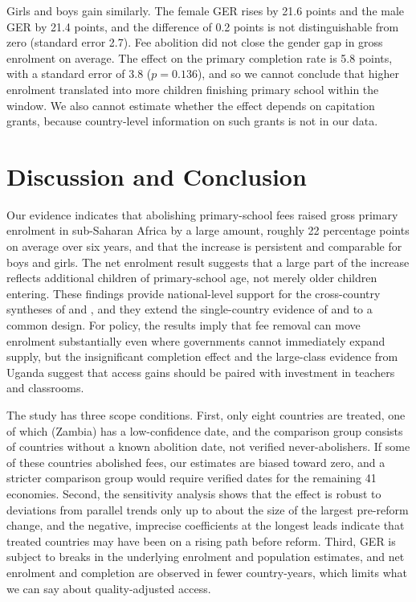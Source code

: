\documentclass[12pt]{article}
\begin{document}


Girls and boys gain similarly. The female GER rises by 21.6 points and the male GER by 21.4 points, and the difference of 0.2 points is not distinguishable from zero (standard error 2.7).
Fee abolition did not close the gender gap in gross enrolment on average. The effect on the primary completion rate is 5.8 points, with a standard error of 3.8 ($p = 0.136$), and so we cannot conclude that higher enrolment translated into more children finishing primary school within the window.
We also cannot estimate whether the effect depends on capitation grants, because country-level information on such grants is not in our data.

\section{Discussion and Conclusion}\label{sec:discussion}

Our evidence indicates that abolishing primary-school fees raised gross primary enrolment in sub-Saharan Africa by a large amount, roughly 22 percentage points on average over six years, and that the increase is persistent and comparable for boys and girls. The net enrolment result suggests that a large part of the increase reflects additional children of primary-school age, not merely older children entering. These findings provide national-level support for the cross-country syntheses of \citet{morgan2014eliminating} and \citet{fermah2026school}, and they extend the single-country evidence of \citet{kan2020evaluating} and \citet{oketch2010free} to a common design. For policy, the results imply that fee removal can move enrolment substantially even where governments cannot immediately expand supply, but the insignificant completion effect and the large-class evidence from Uganda \citep{nakabugo2008universal} suggest that access gains should be paired with investment in teachers and classrooms.

The study has three scope conditions. First, only eight countries are treated, one of which (Zambia) has a low-confidence date, and the comparison group consists of countries without a known abolition date, not verified never-abolishers. If some of these countries abolished fees, our estimates are biased toward zero, and a stricter comparison group would require verified dates for the remaining 41 economies. Second, the sensitivity analysis shows that the effect is robust to deviations from parallel trends only up to about the size of the largest pre-reform change, and the negative, imprecise coefficients at the longest leads indicate that treated countries may have been on a rising path before reform. Third, GER is subject to breaks in the underlying enrolment and population estimates, and net enrolment and completion are observed in fewer country-years, which limits what we can say about quality-adjusted access.
\end{document}

